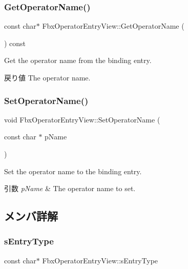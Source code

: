 \subsubsection{\texorpdfstring{Get\+Operator\+Name()}{GetOperatorName()}}
{\footnotesize\ttfamily const char$\ast$ Fbx\+Operator\+Entry\+View\+::\+Get\+Operator\+Name (\begin{DoxyParamCaption}{ }\end{DoxyParamCaption}) const}

Get the operator name from the binding entry. \begin{DoxyReturn}{戻り値}
The operator name. 
\end{DoxyReturn}
\mbox{\label{class_fbx_operator_entry_view_a00d1bca18f1450d07326d22e889c7520}} 
\subsubsection{\texorpdfstring{Set\+Operator\+Name()}{SetOperatorName()}}
{\footnotesize\ttfamily void Fbx\+Operator\+Entry\+View\+::\+Set\+Operator\+Name (\begin{DoxyParamCaption}\item[{const char $\ast$}]{p\+Name }\end{DoxyParamCaption})}

Set the operator name to the binding entry. 
\begin{DoxyParams}{引数}
{\em p\+Name} & The operator name to set. \\
\hline
\end{DoxyParams}


\subsection{メンバ詳解}
\mbox{\label{class_fbx_operator_entry_view_aff3745ef35e5025550d54e7c2343ea95}} 
\subsubsection{\texorpdfstring{s\+Entry\+Type}{sEntryType}}
{\footnotesize\ttfamily const char$\ast$ Fbx\+Operator\+Entry\+View\+::s\+Entry\+Type\hspace{0.3cm}{\ttfamily [static]}}

